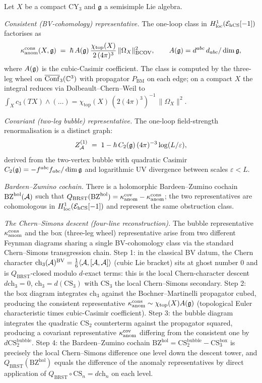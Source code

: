 \begin{theorem}
\label{wn:thm:spine-consistent-covariant}
Let $X$ be a compact CY$_3$ and $\mathfrak{g}$ a semisimple Lie algebra.

\emph{Consistent (BV-cohomology) representative.} The one-loop class
in $H^1_{\mathrm{loc}}(\mathcal{E}_{\mathrm{hCS}}[-1])$ factorises as
\[
\kappa_{\mathrm{anom}}^{\mathrm{cons}}(X, \mathfrak{g}) \;=\; \hbar\, A(\mathfrak{g})\,
\frac{\chi_{\mathrm{top}}(X)}{2\,(4\pi)^3}\,\|\Omega_X\|^2_{\mathrm{BCOV}},
\qquad A(\mathfrak{g}) = d^{abc}\, d_{abc}/\dim \mathfrak{g},
\]
where $A(\mathfrak{g})$ is the cubic-Casimir coefficient. The class is computed
by the three-leg wheel on $\overline{\mathrm{Conf}}_3(\mathbb{C}^3)$ with
propagator $P_{\mathrm{BM}}$ on each edge; on a compact $X$ the integral
reduces via Dolbeault--Chern--Weil to
$\int_X c_3(TX) \wedge (\dots) = \chi_{\mathrm{top}}(X)\,
(2(4\pi)^3)^{-1}\, \|\Omega_X\|^2$.

\emph{Covariant (two-leg bubble) representative.} The one-loop
field-strength renormalisation is a distinct graph:
\[
Z^{(1)}_{\mathcal{A}} \;=\; 1 - \hbar\, C_2(\mathfrak{g})\,(4\pi)^{-3}
\log(L/\varepsilon),
\]
derived from the two-vertex bubble with quadratic Casimir
$C_2(\mathfrak{g}) = -f^{abc} f_{abc}/\dim\mathfrak{g}$ and logarithmic UV divergence
between scales $\varepsilon < L$.

\emph{Bardeen--Zumino cochain.} There is a holomorphic
Bardeen--Zumino cochain $\mathrm{BZ}^{\mathrm{hol}}(\mathcal{A})$ such that
$Q_{\mathrm{BRST}}(\mathrm{BZ}^{\mathrm{hol}})
= \kappa_{\mathrm{anom}}^{\mathrm{cov}} - \kappa_{\mathrm{anom}}^{\mathrm{cons}}$;
the two representatives are cohomologous in
$H^1_{\mathrm{loc}}(\mathcal{E}_{\mathrm{hCS}}[-1])$ and represent the same obstruction
class.

\emph{The Chern--Simons descent (four-line reconstruction).} The
bubble representative $\kappa_{\mathrm{anom}}^{\mathrm{cons}}$ and the box (three-leg
wheel) representative arise from two different Feynman diagrams
sharing a single BV-cohomology class via the standard Chern--Simons
transgression chain. Step 1: in the classical BV datum, the Chern
character $\mathrm{ch}_3(\mathcal{A})^{\mathrm{BV}}
= \tfrac{1}{6}\langle \mathcal{A}, [\mathcal{A}, \mathcal{A}]\rangle$ (cubic Lie bracket)
sits at ghost number $0$ and is $Q_{\mathrm{BRST}}$-closed modulo
$d$-exact terms: this is the local Chern-character
descent $d\mathrm{ch}_3 = 0$, $\mathrm{ch}_3 = d(\mathrm{CS}_3)$
with $\mathrm{CS}_3$ the local Chern--Simons secondary. Step 2: the
box diagram integrates $\mathrm{ch}_3$ against the Bochner--Martinelli
propagator cubed, producing the consistent representative
$\kappa_{\mathrm{anom}}^{\mathrm{cons}} \sim \chi_{\mathrm{top}}(X) A(\mathfrak{g})$
(topological Euler characteristic times cubic-Casimir coefficient).
Step 3: the bubble diagram integrates the quadratic $\mathrm{CS}_2$
counterterm against the propagator squared, producing a covariant
representative $\kappa_{\mathrm{anom}}^{\mathrm{cov}}$ differing from the consistent
one by $d\mathrm{CS}_2^{\mathrm{bubble}}$. Step 4: the
Bardeen--Zumino cochain $\mathrm{BZ}^{\mathrm{hol}} =
\mathrm{CS}_2^{\mathrm{bubble}} - \mathrm{CS}_3^{\mathrm{box}}$
is precisely the local Chern--Simons difference one level down the
descent tower, and $Q_{\mathrm{BRST}}(\mathrm{BZ}^{\mathrm{hol}})$
equals the difference of the anomaly representatives by direct
application of $Q_{\mathrm{BRST}} \circ \mathrm{CS}_n = d
\mathrm{ch}_n$ on each level.


\end{theorem}
